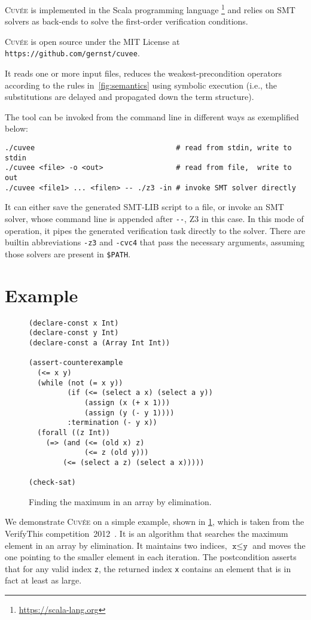 \documentclass[fleqn]{llncs}
\newcommand{\Cuvee}{\textsc{Cuvée}\xspace}
\newcommand{\code}[1]{\texttt{#1}}
\begin{document}
\Cuvee is implemented in the Scala programming language%
    \footnote{\url{https://scala-lang.org}}
and relies on SMT solvers as back-ends to solve the first-order verification conditions.

\Cuvee is open source under the MIT License at \code{https://github.com/gernst/cuvee}.

It reads one or more input files, reduces the weakest-precondition operators according to the rules in~\cref{fig:semantics}
using symbolic execution (i.e., the substitutions are delayed and propagated down the term structure).

The tool can be invoked from the command line in different ways
as exemplified below:
\begin{verbatim}
./cuvee                                 # read from stdin, write to stdin
./cuvee <file> -o <out>                 # read from file,  write to out
./cuvee <file1> ... <filen> -- ./z3 -in # invoke SMT solver directly
\end{verbatim}
It can either save the generated SMT-LIB script to a file,
or invoke an SMT solver, whose command line is appended after \verb|--|, Z3 in this case.
In this mode of operation, it pipes the generated verification task directly to the solver.
There are builtin abbreviations \verb|-z3| and \verb|-cvc4| that pass the necessary arguments,
assuming those solvers are present in \verb|$PATH|.

\section{Example}

\begin{figure}[t]
\begin{verbatim}
(declare-const x Int)
(declare-const y Int)
(declare-const a (Array Int Int))

(assert-counterexample
  (<= x y)
  (while (not (= x y))
         (if (<= (select a x) (select a y))
             (assign (x (+ x 1)))
             (assign (y (- y 1))))
         :termination (- y x))
  (forall ((z Int))
    (=> (and (<= (old x) z)
             (<= z (old y)))
        (<= (select a z) (select a x)))))

(check-sat)
\end{verbatim}
\caption{Finding the maximum in an array by elimination.}
\label{fig:example}
\end{figure}

We demonstrate \Cuvee on a simple example, shown in \cref{fig:example},
which is taken from the VerifyThis competition~2012~\cite{}.
It is an algorithm that searches the maximum element in an array by elimination.
It maintains two indices, $\code{x} \le \code{y}$
and moves the one pointing to the smaller element in each iteration.
The postcondition asserts that for any valid index \code{z},
the returned index \code{x} contains an element that is in fact at least as large.
\end{document}
